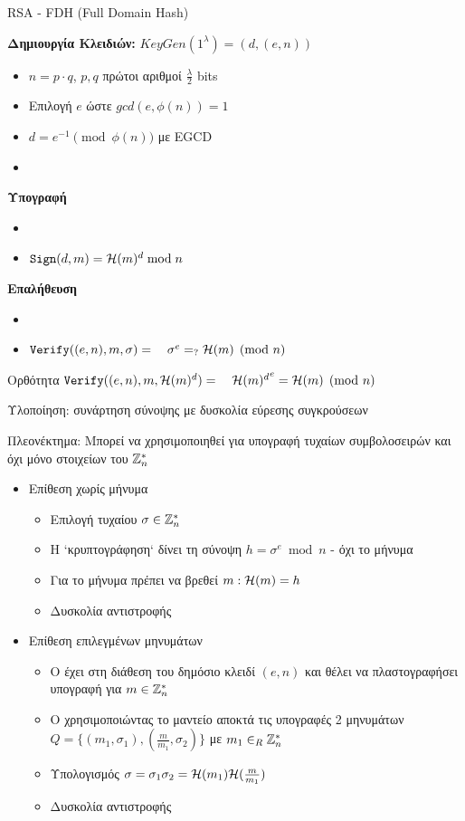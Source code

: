 \documentclass[handout]{beamer}
\begin{document}
\begin{frame}[allowframebreaks]{RSA - FDH (Full Domain Hash)}
 

\textbf{Δημιουργία Κλειδιών:}
$KeyGen(1^{\lambda}) = (d,(e,n))$
\begin{itemize}
\item $n=p \cdot q$, $p,q$ πρώτοι αριθμοί $\frac{\lambda}{2}$ bits
\item Επιλογή $e$ ώστε $gcd(e,\phi(n))=1$
\item $d = e^{-1} \pmod{\phi(n)}$ με EGCD
\item {}
\end{itemize}
  
\textbf{Υπογραφή} 
\begin{itemize}
\item {}
\item $\mathtt{Sign}(d, m) = \mathcal{H}(m)^d \bmod n$
\end{itemize}
\textbf{Επαλήθευση}
\begin{itemize}
\item {}
\item $\verify((e,n), m, \sigma) = \ \ \ \sigma^e =_? \Hash(m) \pmod{n}$
\end{itemize} 

\begin{block}{Ορθότητα}
$\mathtt{Verify}((e,n), m, \mathcal{H}(m)^d)= \ \ \  {\mathcal{H}(m)^d}^e = \mathcal{H}(m) \pmod{n}$
\end{block}
Υλοποίηση: συνάρτηση σύνοψης με δυσκολία εύρεσης συγκρούσεων
 
Πλεονέκτημα: Μπορεί να χρησιμοποιηθεί για υπογραφή τυχαίων συμβολοσειρών και όχι μόνο στοιχείων του $\mathbb{Z}^*_n$\

\framebreak

\begin{itemize}
\item Επίθεση χωρίς μήνυμα
\begin{itemize}
\item Επιλογή τυχαίου $\sigma \in \mathbb{Z}^*_n$
\item Η `κρυπτογράφηση` δίνει τη σύνοψη $h=\sigma^e \bmod{n}$ - όχι το μήνυμα
\item Για το μήνυμα πρέπει να βρεθεί $m: \mathcal{H}(m) = h$
\item Δυσκολία αντιστροφής
\end{itemize}
\framebreak

\item Επίθεση επιλεγμένων μηνυμάτων
\begin{itemize}
\item O \adv έχει στη διάθεση του δημόσιο κλειδί $(e,n)$ και θέλει να πλαστογραφήσει υπογραφή για $m \in \mathbb{Z}^*_n$
\item O \adv χρησιμοποιώντας το μαντείο αποκτά τις υπογραφές 2 μηνυμάτων $Q = \{ (m_1, \sigma_1), (\frac{m}{m_1}, \sigma_2) \}$ με $m_1 \in_R \mathbb{Z}^*_n $
\item Υπολογισμός $\sigma = \sigma_1  \sigma_2 = \mathcal{H}(m_1) \mathcal{H}(\frac{m}{m_1}) $
\item Δυσκολία αντιστροφής
\end{itemize}
\end{itemize} 



\end{frame}
\end{document}
